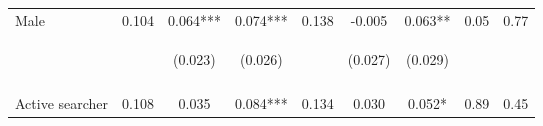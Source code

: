 \begin{tabular}{lcccccccc}
\noalign{\smallskip}Male & 0.104 & 0.064*** & 0.074*** & 0.138 & -0.005 & 0.063** & 0.05 & 0.77\\
 & \begin{footnotesize}\end{footnotesize} & \begin{footnotesize}(0.023)\end{footnotesize} & \begin{footnotesize}(0.026)\end{footnotesize} & \begin{footnotesize}\end{footnotesize} & \begin{footnotesize}(0.027)\end{footnotesize} & \begin{footnotesize}(0.029)\end{footnotesize} & \begin{footnotesize}\end{footnotesize} & \begin{footnotesize}\end{footnotesize}\\
 & \begin{footnotesize}\end{footnotesize} & \begin{footnotesize}[0.027]\end{footnotesize} & \begin{footnotesize}[0.004]\end{footnotesize} & \begin{footnotesize}\end{footnotesize} & \begin{footnotesize}[1.000]\end{footnotesize} & \begin{footnotesize}[0.068]\end{footnotesize} & \begin{footnotesize}\end{footnotesize} & \begin{footnotesize}\end{footnotesize}\\
\noalign{\smallskip}Active searcher & 0.108 & 0.035 & 0.084*** & 0.134 & 0.030 & 0.052* & 0.89 & 0.45\\

\end{tabular}
